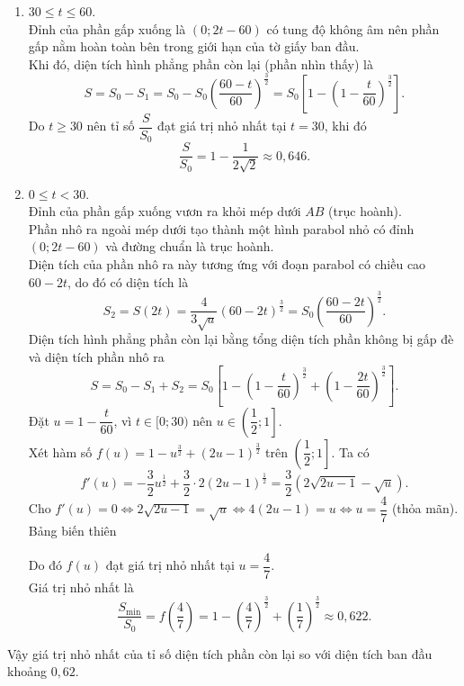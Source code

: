 \begin{ex}
{\begin{enumerate}[\it TH 1:]
			\item $30 \le t \le 60$. \\
			Đỉnh của phần gấp xuống là $(0;2t - 60)$ có tung độ không âm nên phần gấp nằm hoàn toàn bên trong giới hạn của tờ giấy ban đầu.\\
			Khi đó, diện tích hình phẳng phần còn lại (phần nhìn thấy) là
			\[ S = S_0 - S_1 = S_0 - S_0 \left(\dfrac{60-t}{60}\right)^{\frac{3}{2}} = S_0 \left[ 1 - \left(1 - \dfrac{t}{60}\right)^{\frac{3}{2}} \right]. \]
			Do $t \ge 30$ nên tỉ số $\dfrac{S}{S_0}$ đạt giá trị nhỏ nhất tại $t = 30$, khi đó
			\[ \dfrac{S}{S_0} = 1 - \dfrac{1}{2\sqrt{2}} \approx 0{,}646. \]
			\item $0 \le t < 30$. \\
			Đỉnh của phần gấp xuống vươn ra khỏi mép dưới $AB$ (trục hoành).\\
			Phần nhô ra ngoài mép dưới tạo thành một hình parabol nhỏ có đỉnh $(0;2t - 60)$ và đường chuẩn là trục hoành.\\
			Diện tích của phần nhô ra này tương ứng với đoạn parabol có chiều cao $60-2t$, do đó có diện tích là
			\[ S_2 = S(2t) = \dfrac{4}{3\sqrt{a}}(60 - 2t)^{\frac{3}{2}} = S_0 \left(\dfrac{60-2t}{60}\right)^{\frac{3}{2}}. \]
			Diện tích hình phẳng phần còn lại bằng tổng diện tích phần không bị gấp đè và diện tích phần nhô ra
			\[ S = S_0 - S_1 + S_2 = S_0 \left[ 1 - \left(1 - \dfrac{t}{60}\right)^{\frac{3}{2}} + \left(1 - \dfrac{2t}{60}\right)^{\frac{3}{2}} \right]. \]
			Đặt $u = 1 - \dfrac{t}{60}$, vì $t \in [0;30)$ nên $u \in \left( \dfrac{1}{2}; 1 \right]$.\\
			Xét hàm số $f(u) = 1 - u^{\frac{3}{2}} + (2u - 1)^{\frac{3}{2}}$ trên $\left( \dfrac{1}{2}; 1 \right]$.
			Ta có
			\[ f'(u) = -\dfrac{3}{2}u^{\frac{1}{2}} + \dfrac{3}{2} \cdot 2(2u - 1)^{\frac{1}{2}} = \dfrac{3}{2} \left( 2\sqrt{2u - 1} - \sqrt{u} \right). \]
			Cho $f'(u) = 0 \Leftrightarrow 2\sqrt{2u - 1} = \sqrt{u} \Leftrightarrow 4(2u - 1) = u \Leftrightarrow u = \dfrac{4}{7}$ (thỏa mãn).\\
			Bảng biến thiên
			\begin{center}
			\end{center}
			
			Do đó $f(u)$ đạt giá trị nhỏ nhất tại $u = \dfrac{4}{7}$.\\
			Giá trị nhỏ nhất là
			\[ \dfrac{S_{\min}}{S_0} = f\left(\dfrac{4}{7}\right) = 1 - \left(\dfrac{4}{7}\right)^{\frac{3}{2}} + \left(\dfrac{1}{7}\right)^{\frac{3}{2}} \approx 0{,}622. \]
		\end{enumerate}
		Vậy giá trị nhỏ nhất của tỉ số diện tích phần còn lại so với diện tích ban đầu khoảng $0{,}62$.
	}
\end{ex}


